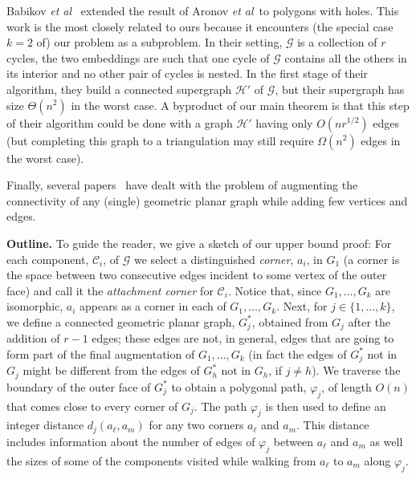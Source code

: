 \documentclass{patmorin}
\newcommand{\etal}{\emph{et al}}
\begin{document}
Babikov \etal\ \cite{babikov.souvaine.ea:constructing} extended the result of Aronov \etal\ to polygons with holes. This work is the most closely related to ours because it encounters (the special case $k=2$ of) our problem as a subproblem. In their setting, $\mathcal G$ is a collection of $r$ cycles, the two embeddings are such that one cycle of $\mathcal G$ contains all the others in its interior and no other pair of cycles is nested. In the first stage of their algorithm, they build a connected supergraph $\mathcal{H}'$ of $\mathcal{G}$, but their supergraph has size $\Theta(n^2)$ in the worst case.  A byproduct of our main theorem is that this step of their algorithm could be done with a graph $\mathcal{H}'$ having only $O(nr^{1/2})$ edges (but completing this graph to a triangulation may still require $\Omega(n^2)$ edges in the worst case).

Finally, several papers~\cite{aghtu-acgg-08,rw-acpgg-12,t-capsg-12} have dealt with the problem of augmenting the connectivity of any (single) geometric planar graph while adding few vertices and edges.

\noindent\textbf{Outline.} To guide the reader, we give a sketch of our upper bound proof: For each component, $\mathcal C_i$, of $\mathcal G$ we select a distinguished \emph{corner}, $a_i$, in $G_1$ (a corner is the space between two consecutive edges incident to some vertex of the outer face) and call it the \emph{attachment corner} for $\mathcal C_i$.  Notice that, since $G_1,\ldots,G_k$ are isomorphic, $a_i$ appears as a corner in each of $G_1,\ldots,G_k$. Next, for $j\in \{1,\dots,k\}$, we define a connected geometric planar graph, $G_j^*$, obtained from $G_j$ after the addition of $r-1$ edges; these edges are not, in general, edges that are going to form part of the final augmentation of $G_1,\ldots,G_k$ (in fact the edges of $G_j^*$ not in $G_j$ might be different from the edges of  $G_h^*$ not in $G_h$, if $j\neq h$). We traverse the boundary of the outer face
of $G_j^*$ to obtain a polygonal path, $\varphi_j$, of length $O(n)$ that comes
close to every corner of $G_j$.  The path $\varphi_j$ is then used to define an
integer distance $d_j(a_\ell,a_m)$ for any two corners $a_\ell$ and $a_m$. This distance includes information about the number of edges of $\varphi_j$ between $a_\ell$ and $a_m$ as well the sizes of some of the components visited while walking from $a_\ell$ to $a_m$ along $\varphi_j$.
\end{document}
